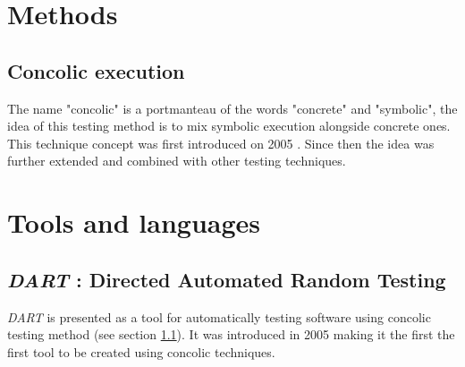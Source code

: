 \documentclass[11pt]{article}
\begin{document}
  \section{Methods}
    
    \subsection{Concolic execution}
    \label{subsec:concolicExecution}
    	The name "concolic" is a portmanteau of the words "concrete" and "symbolic", the idea of this testing method is to mix symbolic execution alongside concrete ones.\\
    	
    	This technique concept was first introduced on 2005 \cite{godefroid2005dart}. %
    	Since then the idea was further extended and combined with other testing techniques.

  \section{Tools and languages}
    
    \subsection{\emph{DART} : Directed Automated Random Testing}
    	\emph{DART} is presented as a tool for automatically testing software using concolic testing method (see section \ref{subsec:concolicExecution}). It was introduced in 2005 making it the first the first tool to be created using concolic techniques. \\
    	
\end{document}

